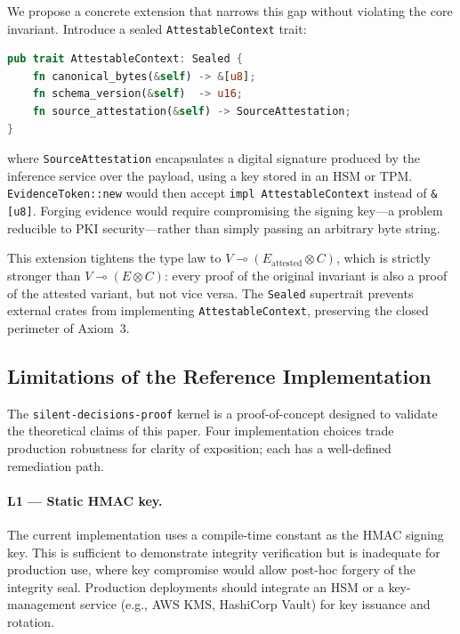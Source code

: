 We propose a concrete extension that narrows this gap without
violating the core invariant.
Introduce a sealed \texttt{AttestableContext} trait:

\begin{lstlisting}[language=Rust,caption={AttestableContext trait
  (proposed extension)}]
pub trait AttestableContext: Sealed {
    fn canonical_bytes(&self) -> &[u8];
    fn schema_version(&self)  -> u16;
    fn source_attestation(&self) -> SourceAttestation;
}
\end{lstlisting}

\noindent
where \texttt{SourceAttestation} encapsulates a digital signature
produced by the inference service over the payload, using a key
stored in an HSM or TPM.
\texttt{EvidenceToken::new} would then accept
\texttt{impl AttestableContext} instead of \texttt{\&[u8]}.
Forging evidence would require compromising the signing key---a
problem reducible to PKI security---rather than simply passing
an arbitrary byte string.

This extension tightens the type law to
$V \multimap (E_{\text{attested}} \otimes C)$,
which is strictly stronger than $V \multimap (E \otimes C)$:
every proof of the original invariant is also a proof of the
attested variant, but not vice versa.
The \texttt{Sealed} supertrait prevents external crates from
implementing \texttt{AttestableContext}, preserving the closed
perimeter of Axiom~3.

\subsection{Limitations of the Reference Implementation}
\label{sec:limitations}

The \texttt{silent-decisions-proof} kernel is a proof-of-concept
designed to validate the theoretical claims of this paper.
Four implementation choices trade production robustness for
clarity of exposition; each has a well-defined remediation path.

\paragraph{L1 — Static HMAC key.}
The current implementation uses a compile-time constant as the HMAC
signing key.
This is sufficient to demonstrate integrity verification but is
inadequate for production use, where key compromise would allow
post-hoc forgery of the integrity seal.
Production deployments should integrate an HSM or a
key-management service (e.g., AWS KMS, HashiCorp Vault)
for key issuance and rotation.

